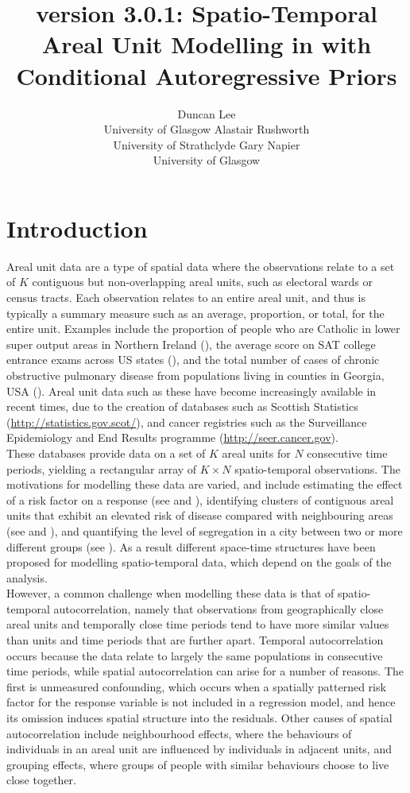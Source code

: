 \documentclass[article, nojss]{jss}
\author{Duncan Lee\\University of Glasgow \And Alastair Rushworth\\University of Strathclyde \And Gary Napier\\University of Glasgow}
\title{\pkg{CARBayesST} version 3.0.1: Spatio-Temporal Areal Unit Modelling in \proglang{R} with Conditional Autoregressive Priors}
\begin{document}





\section{Introduction}
Areal unit data are a type of spatial data where the observations relate to a set of $K$ contiguous but non-overlapping areal units, such as electoral wards or census tracts. Each observation relates to an entire areal unit, and thus is typically a summary measure such as an average, proportion, or total, for the entire unit. Examples include the proportion of people who are Catholic in lower super output areas in Northern Ireland (\citealp{lee2015}), the average score on SAT college entrance exams across US states (\citealp{wall2004}), and the total number of cases of chronic obstructive pulmonary disease from populations living in counties in Georgia, USA (\citealp{choiENV11}). Areal unit data such as these have become increasingly available in recent times, due to the creation of databases such as Scottish Statistics (\url{http://statistics.gov.scot/}), and cancer registries such as the Surveillance Epidemiology and End Results programme (\url{http://seer.cancer.gov}).\\

 These databases provide data on a set of $K$ areal units for $N$ consecutive time periods, yielding a rectangular array of $K\times N$ spatio-temporal observations. The motivations for modelling these data are varied, and include estimating the effect of a risk factor on a response (see \citealp{wakefield2007} and \citealp{lee2009}), identifying clusters of contiguous areal units that exhibit an elevated risk of disease compared with neighbouring areas (see \citealp{charras2012} and \citealp{anderson2014}), and quantifying the level of segregation in a city between two or more different groups (see \citealp{lee2015}). As a result different space-time structures have been proposed for modelling spatio-temporal data, which depend on the goals of the analysis.\\
 

However, a common challenge when modelling these data is that of spatio-temporal autocorrelation, namely that observations from geographically close areal units and temporally close time periods tend to have more similar values than units and time periods that are further apart. Temporal autocorrelation occurs because the data relate to largely the same populations in consecutive time periods, while spatial autocorrelation can arise for a number of reasons. The first is unmeasured confounding, which occurs when a spatially patterned risk factor for the response variable is not included in a regression  model, and hence its omission induces spatial structure into the residuals. Other causes of spatial autocorrelation include neighbourhood effects, where the behaviours of individuals in an areal unit  are influenced by individuals in adjacent units, and grouping effects, where groups of people with similar behaviours choose to live close together.\\
\end{document}
